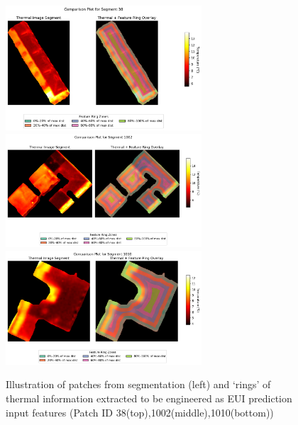 \documentclass[preprint,12pt]{elsarticle}
\begin{document}
        \begin{figure}[H]
            \centering
            \includegraphics[width=0.65\textwidth]{img/comparison_overlay_38.png}
            \includegraphics[width=0.65\textwidth]{img/comparison_overlay_1002.png}
            \includegraphics[width=0.65\textwidth]{img/comparison_overlay_1010.png}
            \caption{Illustration of patches from segmentation (left) and `rings' of thermal information extracted to be engineered as EUI prediction input features (Patch ID 38(top),1002(middle),1010(bottom))}
            \label{fig:ring-five}
        \end{figure}
\end{document}
